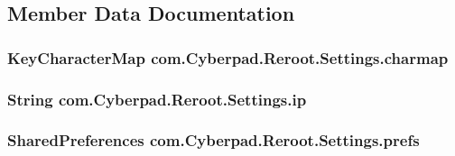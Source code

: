 \subsection{\-Member \-Data \-Documentation}
\hypertarget{classcom_1_1_cyberpad_1_1_reroot_1_1_settings_a47ef14787b76da9f78c13138328e6054}{
\subsubsection[{charmap}]{\setlength{\rightskip}{0pt plus 5cm}\-Key\-Character\-Map {\bf com.\-Cyberpad.\-Reroot.\-Settings.\-charmap}}}
\label{classcom_1_1_cyberpad_1_1_reroot_1_1_settings_a47ef14787b76da9f78c13138328e6054}
\hypertarget{classcom_1_1_cyberpad_1_1_reroot_1_1_settings_ab0bac42aaa04dcb632eae42bef9f84cc}{
\subsubsection[{ip}]{\setlength{\rightskip}{0pt plus 5cm}\-String {\bf com.\-Cyberpad.\-Reroot.\-Settings.\-ip}}}
\label{classcom_1_1_cyberpad_1_1_reroot_1_1_settings_ab0bac42aaa04dcb632eae42bef9f84cc}
\hypertarget{classcom_1_1_cyberpad_1_1_reroot_1_1_settings_a3a54c0721f873c2ddf5de4eac53fbe24}{
\subsubsection[{prefs}]{\setlength{\rightskip}{0pt plus 5cm}\-Shared\-Preferences {\bf com.\-Cyberpad.\-Reroot.\-Settings.\-prefs}}}
\label{classcom_1_1_cyberpad_1_1_reroot_1_1_settings_a3a54c0721f873c2ddf5de4eac53fbe24}
